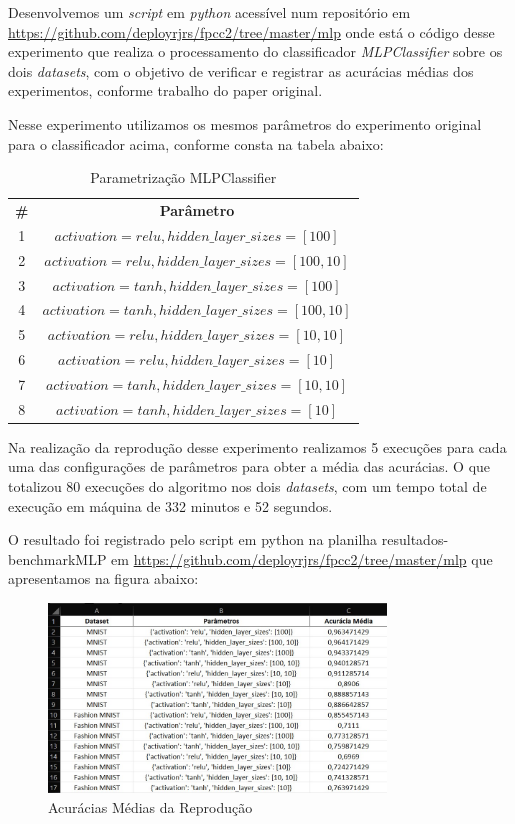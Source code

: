 \documentclass{article}
\begin{document}
Desenvolvemos um \textit{script} em \textit{python} acessível num repositório  em \url{https://github.com/deployrjrs/fpcc2/tree/master/mlp} onde está o código desse experimento que realiza o processamento do classificador \textit{MLPClassifier} sobre os dois \textit{datasets}, com o objetivo de verificar e registrar as acurácias médias dos experimentos, conforme  trabalho do paper original. 

Nesse experimento utilizamos os mesmos parâmetros do experimento original para o classificador acima, conforme consta na tabela abaixo:
\begin{table}[h]
\centering
\begin{tabular}{cc}
    \toprule
    \midrule
    \textbf{\#} & \textbf{Parâmetro} \\
    1 & $activation=relu, hidden\_layer\_sizes=[100]$  \\
    2 & $activation=relu, hidden\_layer\_sizes=[100, 10]$ \\
    3 & $activation=tanh, hidden\_layer\_sizes=[100] $ \\
    4 & $activation=tanh, hidden\_layer\_sizes=[100, 10]$ \\
    5 & $activation=relu, hidden\_layer\_sizes=[10, 10]$ \\
    6 & $activation=relu, hidden\_layer\_sizes=[10]$  \\
    7 & $activation=tanh, hidden\_layer\_sizes=[10, 10]$ \\
    8 & $activation=tanh, hidden\_layer\_sizes=[10]$ \\
\bottomrule
\end{tabular}
\caption{Parametrização MLPClassifier}
\label{tab:tabela2}
\end{table}

Na realização da reprodução desse experimento realizamos 5 execuções para cada uma das configurações de parâmetros para obter a média das acurácias. O que totalizou 80 execuções do algoritmo nos dois \textit{datasets}, com um tempo total de execução em máquina de 332 minutos e 52 segundos.

O resultado foi registrado pelo script em python na planilha resultados-benchmarkMLP em \url{https://github.com/deployrjrs/fpcc2/tree/master/mlp} que apresentamos na figura abaixo:
\begin{figure}[H]
    \centering
    \includegraphics[width=0.8\textwidth]{mlpplan01.jpg}
    \caption{Acurácias Médias da Reprodução}
    \label{fig:planm1}
\end{figure}
\end{document}
